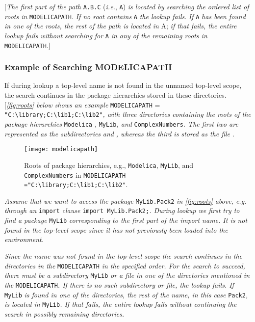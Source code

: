 {[}\emph{The first part of the path} \lstinline!A.B.C! (\emph{i.e.}, \lstinline!A!) \emph{is
located by searching the ordered list of roots in} \lstinline!MODELICAPATH!.
\emph{If no root contains} \lstinline!A! \emph{the lookup fails}. \emph{If} \lstinline!A!
\emph{has been found in one of the roots, the rest of the path is
located in} A; \emph{if that fails, the entire lookup fails without
searching} \emph{for} \lstinline!A! \emph{in any of the remaining roots in}
\lstinline!MODELICAPATH!.{]}

\subsubsection{Example of Searching MODELICAPATH}

If during lookup a top-level name is not found in the unnamed top-level
scope, the search continues in the package hierarchies stored in these
directories. {[}\emph{\autoref{fig:roots} below shows an example} \lstinline!MODELICAPATH! =
\lstinline!"C:\library;C:\lib1;C:\lib2"!\emph{,
with three directories containing the roots of the package hierarchies}
\lstinline!Modelica! \emph{,} \lstinline!MyLib!\emph{, and} \lstinline!ComplexNumbers!\emph{. The first two are represented as the subdirectories}
 \emph{and}
\emph{, whereas the third is stored
as the file} \emph{.}

\begin{figure}[H]
\caption{Roots of package hierarchies, e.g.,
\texttt{Modelica}, \texttt{MyLib}, and \texttt{ComplexNumbers} in
\texttt{MODELICAPATH ="C:\textbackslash library;C:\textbackslash lib1;C:\textbackslash lib2"}.}
\label{fig:roots}
\texttt{[image: modelicapath]}
\end{figure}

\emph{Assume that we want to access the package} \lstinline!MyLib.Pack2! \emph{in
\autoref{fig:roots} above, e.g. through an} \lstinline!import! \emph{clause}
\lstinline!import MyLib.Pack2;!\emph{. During lookup we first try to find a package} \lstinline!MyLib!
\emph{corresponding to the first part of the import name. It is not
found in the top-level scope since it has not previously been loaded
into the environment. }

\emph{Since the name was not found in the top-level scope the search
continues in the directories in the} \lstinline!MODELICAPATH! \emph{in the specified
order. For the search to succeed, there must be a subdirectory} \lstinline!MyLib!
\emph{or a file}  \emph{in one of the directories mentioned in
the} \lstinline!MODELICAPATH!\emph{. If there is no such subdirectory or file, the
lookup fails. If} \lstinline!MyLib! \emph{is found in one of the directories, the
rest of the name, in this case} \lstinline!Pack2!\emph{, is located in} \lstinline!MyLib!\emph{.
If that fails, the entire lookup fails without continuing the search in
possibly remaining directories.}

